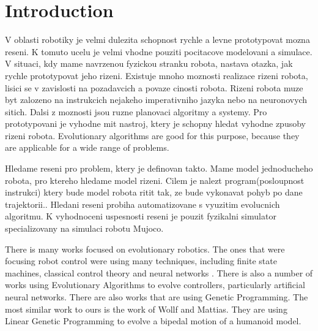 \documentclass{ExcelAtFIT}
\affiliation{*%
  \href{mailto:herout@fit.vutbr.cz}{herout@fit.vutbr.cz},
  \textit{Faculty of Information Technology, Brno University of Technology}}
\begin{document}
\startdocument



\section{Introduction}

V oblasti robotiky je velmi dulezita schopnost rychle a levne prototypovat mozna reseni.
K tomuto ucelu je velmi vhodne pouziti pocitacove modelovani a simulace.
V situaci, kdy mame navrzenou fyzickou stranku robota, nastava otazka, jak rychle prototypovat jeho rizeni.
Existuje mnoho moznosti realizace rizeni robota, lisici se v zavislosti na pozadavcich a povaze cinosti robota.
Rizeni robota muze byt zalozeno na instrukcich nejakeho imperativniho jazyka nebo na neuronovych sitich.
Dalsi z moznosti jsou ruzne planovaci algoritmy a systemy. 
Pro prototypovani je vyhodne mit nastroj, ktery je schopny hledat vyhodne zpusoby rizeni robota.
Evolutionary algorithms are good for this purpose, because they are applicable for a wide range of problems.

Hledame reseni pro problem, ktery je definovan takto.
Mame model jednoducheho robota, pro ktereho hledame model rizeni.
Cilem je nalezt program(posloupnost instrukci) ktery bude model robota ritit tak, ze bude vykonavat pohyb po dane trajektorii..
Hledani reseni probiha automatizovane s vyuzitim evolucnich algoritmu.
K vyhodnoceni uspesnosti reseni je pouzit fyzikalni simulator specializovany na simulaci robotu Mujoco\cite{Todorov2012}.

There is many works focused on evolutionary robotics.
The ones that were focusing robot control were using many techniques, including finite state machines\cite{Hodgins1996}, classical control theory\cite{Mita1984} and neural networks \cite{Reil2002}\cite{Lewis1996}.
There is also a number of works using Evolutionary Algorithms to evolve controllers, particularly artificial neural networks\cite{Randall1992}\cite{Farooq2013}.
There are also works that are using Genetic Programming\cite{Macedo2017}.
The most similar work to ours is the work of Wollf and Mattias\cite{Wolff2007}.
They are using Linear Genetic Programming to evolve a bipedal motion of a humanoid model.
\end{document}
